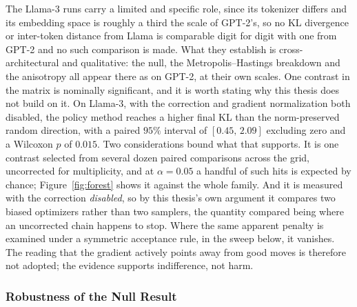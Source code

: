 The Llama-3 runs carry a limited and specific role, since its tokenizer differs and its embedding space is roughly a third the scale of GPT-2's, so no KL divergence or inter-token distance from Llama is comparable digit for digit with one from GPT-2 and no such comparison is made. What they establish is cross-architectural and qualitative: the null, the Metropolis--Hastings breakdown and the anisotropy all appear there as on GPT-2, at their own scales. One contrast in the matrix is nominally significant, and it is worth stating why this thesis does not build on it. On Llama-3, with the correction and gradient normalization both disabled, the policy method reaches a higher final KL than the norm-preserved random direction, with a paired $95\%$ interval of $[0.45,\, 2.09]$ excluding zero and a Wilcoxon $p$ of $0.015$. Two considerations bound what that supports. It is one contrast selected from several dozen paired comparisons across the grid, uncorrected for multiplicity, and at $\alpha = 0.05$ a handful of such hits is expected by chance; Figure~\ref{fig:forest} shows it against the whole family. And it is measured with the correction \emph{disabled}, so by this thesis's own argument it compares two biased optimizers rather than two samplers, the quantity compared being where an uncorrected chain happens to stop. Where the same apparent penalty is examined under a symmetric acceptance rule, in the sweep below, it vanishes. The reading that the gradient actively points away from good moves is therefore not adopted; the evidence supports indifference, not harm.

\subsubsection{Robustness of the Null Result}
\label{sec:results-robust}

